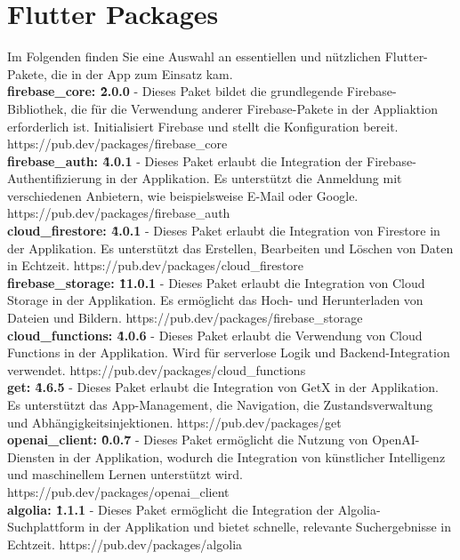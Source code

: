 \section{Flutter Packages}

Im Folgenden finden Sie eine Auswahl an essentiellen und nützlichen Flutter-Pakete, die in der App zum Einsatz kam.
\\
\textbf{firebase\_core: \^2.0.0} - Dieses Paket bildet die grundlegende Firebase-Bibliothek, die für die Verwendung anderer Firebase-Pakete in der Appliaktion erforderlich ist. Initialisiert Firebase und stellt die Konfiguration bereit.
https://pub.dev/packages/firebase\_core
\\
\textbf{firebase\_auth: \^4.0.1} - Dieses Paket erlaubt die Integration der Firebase-Authentifizierung in der Applikation. Es unterstützt die Anmeldung mit verschiedenen Anbietern, wie beispielsweise E-Mail oder Google.
https://pub.dev/packages/firebase\_auth
\\
\textbf{cloud\_firestore: \^4.0.1} - Dieses Paket erlaubt die Integration von Firestore in der Applikation. Es unterstützt das Erstellen, Bearbeiten und Löschen von Daten in Echtzeit.
https://pub.dev/packages/cloud\_firestore
\\
\textbf{firebase\_storage: \^11.0.1} - Dieses Paket erlaubt die Integration von Cloud Storage in der Applikation. Es ermöglicht das Hoch- und Herunterladen von Dateien und Bildern.
https://pub.dev/packages/firebase\_storage
\\
\textbf{cloud\_functions: \^4.0.6} - Dieses Paket erlaubt die Verwendung von Cloud Functions in der Applikation. Wird für serverlose Logik und Backend-Integration verwendet.
https://pub.dev/packages/cloud\_functions
\\
\textbf{get: \^4.6.5} - Dieses Paket erlaubt die Integration von GetX in der Applikation. Es unterstützt das App-Management, die Navigation, die Zustandsverwaltung und Abhängigkeitsinjektionen.
https://pub.dev/packages/get
\\
\textbf{openai\_client: \^0.0.7} - Dieses Paket ermöglicht die Nutzung von OpenAI-Diensten in der Applikation, wodurch die Integration von künstlicher Intelligenz und maschinellem Lernen unterstützt wird.
https://pub.dev/packages/openai\_client
\\
\textbf{algolia: \^1.1.1} - Dieses Paket ermöglicht die Integration der Algolia-Suchplattform in der Applikation und bietet schnelle, relevante Suchergebnisse in Echtzeit.
https://pub.dev/packages/algolia
\\
